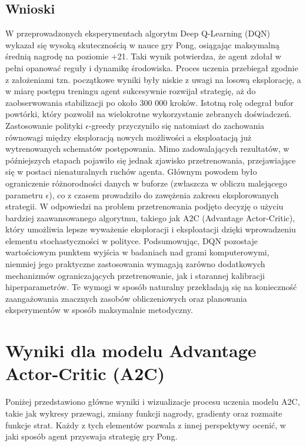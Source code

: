 \documentclass[a4paper, 12pt]{article}
\numberwithin{equation}{section}
\begin{document}
    \subsection{Wnioski}
    W przeprowadzonych eksperymentach algorytm Deep Q-Learning (DQN) wykazał się wysoką skutecznością w nauce gry Pong, osiągając maksymalną średnią nagrodę na poziomie +21. Taki wynik potwierdza, że agent zdołał w pełni opanować reguły i dynamikę środowiska. Proces uczenia przebiegał zgodnie z założeniami tzn. początkowe wyniki były niskie z uwagi na losową eksplorację, a w miarę postępu treningu agent sukcesywnie rozwijał strategię, aż do zaobserwowania stabilizacji po około 300 000 kroków.
    Istotną rolę odegrał bufor powtórki, który pozwolił na wielokrotne wykorzystanie zebranych doświadczeń. Zastosowanie polityki \( \epsilon \)-greedy przyczyniło się natomiast do zachowania równowagi między eksploracją nowych możliwości a eksploatacją już wytrenowanych schematów postępowania. Mimo zadowalających rezultatów, w późniejszych etapach pojawiło się jednak zjawisko przetrenowania, przejawiające się w postaci nienaturalnych ruchów agenta. Głównym powodem było ograniczenie różnorodności danych w buforze (zwłaszcza w obliczu malejącego parametru \( \epsilon \)), co z czasem prowadziło do zawężenia zakresu eksplorowanych strategii.
    W odpowiedzi na problem przetrenowania podjęto decyzję o użyciu bardziej zaawansowanego algorytmu, takiego jak A2C (Advantage Actor-Critic), który umożliwia lepsze wyważenie eksploracji i eksploatacji dzięki wprowadzeniu elementu stochastyczności w polityce. Podsumowując, DQN pozostaje wartościowym punktem wyjścia w badaniach nad grami komputerowymi, niemniej jego praktyczne zastosowania wymagają zarówno dodatkowych mechanizmów ograniczających przetrenowanie, jak i starannej kalibracji hiperparametrów. Te wymogi w sposób naturalny przekładają się na konieczność zaangażowania znacznych zasobów obliczeniowych oraz planowania eksperymentów w sposób maksymalnie metodyczny.
    \section{Wyniki dla modelu Advantage Actor-Critic (A2C)}
    Poniżej przedstawiono główne wyniki i wizualizacje procesu uczenia modelu A2C, takie jak wykresy przewagi, zmiany funkcji nagrody, gradienty oraz rozmaite funkcje strat. Każdy z tych elementów pozwala z innej perspektywy ocenić, w jaki sposób agent przyswaja strategię gry Pong.
\end{document}
